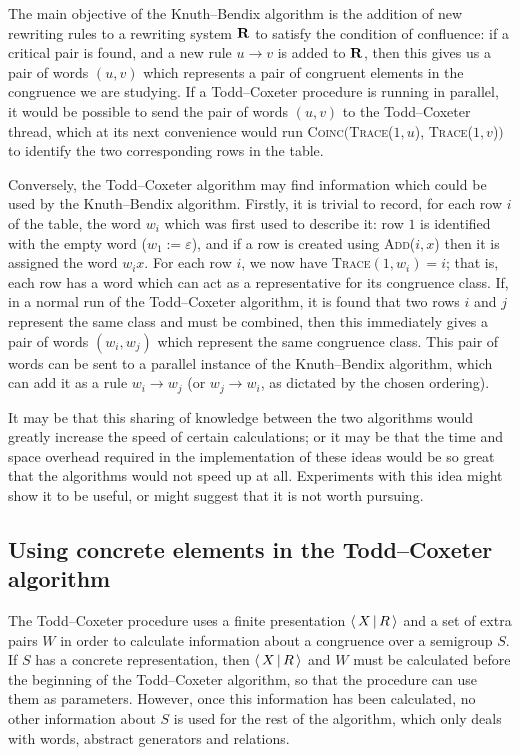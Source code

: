 The main objective of the Knuth--Bendix algorithm is the addition of new rewriting rules to a
rewriting system $\mathbf{R}$ to satisfy the condition of confluence: if a critical
pair is found, and a new rule $u \to v$ is added to $\mathbf{R}$, then this gives us a
pair of words $(u,v)$ which represents a pair of congruent elements in the congruence we
are studying.  If a Todd--Coxeter procedure is running in parallel, it would be
possible to send the pair of words $(u,v)$ to the Todd--Coxeter thread, which
at its next convenience would run \textsc{Coinc$\big($Trace($1, u$), Trace($1, v$)$\big)$}
to identify the two corresponding rows in the table.

Conversely, the Todd--Coxeter algorithm may find information which could be used by
the Knuth--Bendix algorithm.  Firstly, it is trivial to record, for each row $i$ of the table,
the word $w_i$ which was first used to describe it: row $1$ is identified with
the empty word ($w_1 := \varepsilon$), and if a row is created using
\textsc{Add($i, x$)} then it is assigned the word $w_ix$.  For each row $i$, we
now have \textsc{Trace}$(1, w_i) = i$; that is, each row has a word which can
act as a representative for its congruence class.
If, in a normal run of the Todd--Coxeter algorithm, it is found that two rows $i$ and $j$
represent the same class and must be combined, then this immediately gives a
pair of words $(w_i,w_j)$ which represent the same congruence class.  This pair
of words can be sent to a parallel instance of the Knuth--Bendix algorithm, which can add it as
a rule $w_i \to w_j$ (or $w_j \to w_i$, as dictated by the chosen ordering).

It may be that this sharing of knowledge between the two algorithms would
greatly increase the speed of certain calculations; or it may be that the time
and space overhead required in the implementation of these ideas would be so great that the
algorithms would not speed up at all.  Experiments with this idea might show it
to be useful, or might suggest that it is not worth pursuing.

\subsection{Using concrete elements in the Todd--Coxeter algorithm}
\label{sec:tc-concrete-elms}
The Todd--Coxeter procedure uses a finite presentation $\left\langle \, X \, \middle| \, R \, \right\rangle$ and a set of
extra pairs $W$ in order to calculate information about a congruence
over a semigroup $S$.  If $S$ has a concrete representation, then $\left\langle \, X \, \middle| \, R \, \right\rangle$ and $W$
must be calculated before the beginning of the Todd--Coxeter algorithm, so that the procedure
can use them as parameters.  However, once this information has been calculated,
no other information about $S$ is used for the rest of the algorithm, which only
deals with words, abstract generators and relations.

